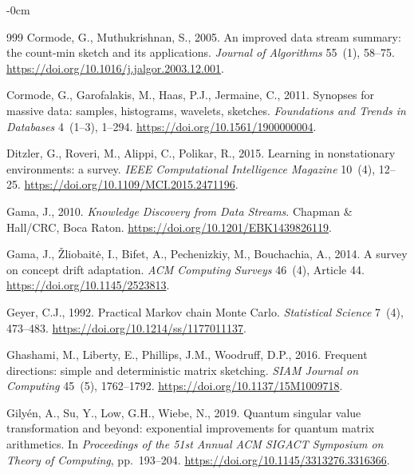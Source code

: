 \documentclass[sensors,article,submit,pdftex,moreauthors]{Definitions/mdpi}
\begin{document}
\begin{adjustwidth}{-\extralength}{0cm}
\begin{thebibliography}{999}
Cormode, G., Muthukrishnan, S., 2005.
\newblock An improved data stream summary: the count-min sketch and its applications.
\newblock \emph{Journal of Algorithms} 55~(1), 58--75.
\newblock \url{https://doi.org/10.1016/j.jalgor.2003.12.001}.

Cormode, G., Garofalakis, M., Haas, P.J., Jermaine, C., 2011.
\newblock Synopses for massive data: samples, histograms, wavelets, sketches.
\newblock \emph{Foundations and Trends in Databases} 4~(1--3), 1--294.
\newblock \url{https://doi.org/10.1561/1900000004}.

Ditzler, G., Roveri, M., Alippi, C., Polikar, R., 2015.
\newblock Learning in nonstationary environments: a survey.
\newblock \emph{IEEE Computational Intelligence Magazine} 10~(4), 12--25.
\newblock \url{https://doi.org/10.1109/MCI.2015.2471196}.

Gama, J., 2010.
\newblock \emph{Knowledge Discovery from Data Streams}.
\newblock Chapman \& Hall/CRC, Boca Raton.
\newblock \url{https://doi.org/10.1201/EBK1439826119}.

Gama, J., \v{Z}liobait\.e, I., Bifet, A., Pechenizkiy, M., Bouchachia, A., 2014.
\newblock A survey on concept drift adaptation.
\newblock \emph{ACM Computing Surveys} 46~(4), Article 44.
\newblock \url{https://doi.org/10.1145/2523813}.

Geyer, C.J., 1992.
\newblock Practical Markov chain Monte Carlo.
\newblock \emph{Statistical Science} 7~(4), 473--483.
\newblock \url{https://doi.org/10.1214/ss/1177011137}.

Ghashami, M., Liberty, E., Phillips, J.M., Woodruff, D.P., 2016.
\newblock Frequent directions: simple and deterministic matrix sketching.
\newblock \emph{SIAM Journal on Computing} 45~(5), 1762--1792.
\newblock \url{https://doi.org/10.1137/15M1009718}.

Gily\'en, A., Su, Y., Low, G.H., Wiebe, N., 2019.
\newblock Quantum singular value transformation and beyond: exponential improvements for quantum matrix arithmetics.
\newblock In \emph{Proceedings of the 51st Annual ACM SIGACT Symposium on Theory of Computing}, pp.~193--204.
\newblock \url{https://doi.org/10.1145/3313276.3316366}.


\end{thebibliography}
\end{adjustwidth}
\end{document}
